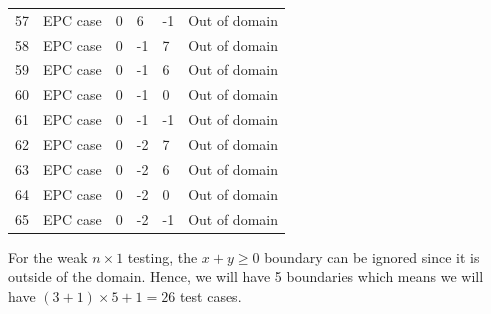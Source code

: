 \documentclass[12pt, letterpaper, titlepage]{article}
\begin{document}
\begin{tabularx}{\textwidth}{|X|X|a|a|a|X|}
    57 & EPC case & 0 & 6 & -1 & Out of domain \\
    58 & EPC case & 0 & -1 & 7 & Out of domain \\
    59 & EPC case & 0 & -1 & 6 & Out of domain \\
    60 & EPC case & 0 & -1 & 0 & Out of domain \\
    61 & EPC case & 0 & -1 & -1 & Out of domain \\
    62 & EPC case & 0 & -2 & 7 & Out of domain \\
    63 & EPC case & 0 & -2 & 6 & Out of domain \\
    64 & EPC case & 0 & -2 & 0 & Out of domain \\
    65 & EPC case & 0 & -2 & -1 & Out of domain \\
    \hline
\end{tabularx}

For the weak $n\times1$ testing, the $x+y\geq0$ boundary can be ignored since it is outside of the domain. Hence, we will have 5 boundaries which means we will have $(3+1)\times 5 + 1 = 26$ test cases.
\end{document}
